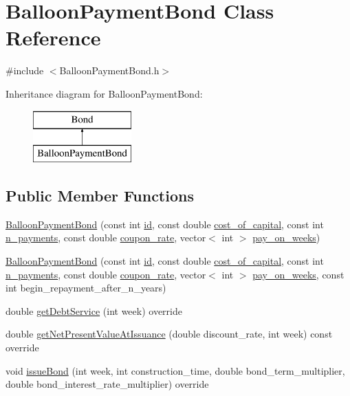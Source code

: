 \hypertarget{classBalloonPaymentBond}{}\section{Balloon\+Payment\+Bond Class Reference}
\label{classBalloonPaymentBond}


{\ttfamily \#include $<$Balloon\+Payment\+Bond.\+h$>$}

Inheritance diagram for Balloon\+Payment\+Bond\+:\begin{figure}[H]
\begin{center}
\leavevmode
\includegraphics[height=2.000000cm]{classBalloonPaymentBond}
\end{center}
\end{figure}
\subsection*{Public Member Functions}
\begin{DoxyCompactItemize}
\item 
\mbox{\hyperlink{classBalloonPaymentBond_a03b25124896e67f851a35721c37705fe}{Balloon\+Payment\+Bond}} (const int \mbox{\hyperlink{classBond_a7f75bcafbc16676ad6dbafbf40afae4a}{id}}, const double \mbox{\hyperlink{classBond_ad98df7d28b398e620286f95ee085439b}{cost\+\_\+of\+\_\+capital}}, const int \mbox{\hyperlink{classBond_a4a227b6de2eeada118d82ab1633b1db8}{n\+\_\+payments}}, const double \mbox{\hyperlink{classBond_a5f66785534e24caa43d9f730130a6463}{coupon\+\_\+rate}}, vector$<$ int $>$ \mbox{\hyperlink{classBond_ae8dd46fcbf95c993460ffe4ea1f52739}{pay\+\_\+on\+\_\+weeks}})
\item 
\mbox{\hyperlink{classBalloonPaymentBond_afc8bb53b6642dac9811414b447279e5b}{Balloon\+Payment\+Bond}} (const int \mbox{\hyperlink{classBond_a7f75bcafbc16676ad6dbafbf40afae4a}{id}}, const double \mbox{\hyperlink{classBond_ad98df7d28b398e620286f95ee085439b}{cost\+\_\+of\+\_\+capital}}, const int \mbox{\hyperlink{classBond_a4a227b6de2eeada118d82ab1633b1db8}{n\+\_\+payments}}, const double \mbox{\hyperlink{classBond_a5f66785534e24caa43d9f730130a6463}{coupon\+\_\+rate}}, vector$<$ int $>$ \mbox{\hyperlink{classBond_ae8dd46fcbf95c993460ffe4ea1f52739}{pay\+\_\+on\+\_\+weeks}}, const int begin\+\_\+repayment\+\_\+after\+\_\+n\+\_\+years)
\item 
double \mbox{\hyperlink{classBalloonPaymentBond_a8648a2ae688f90a3b2e6689711c22b9d}{get\+Debt\+Service}} (int week) override
\item 
double \mbox{\hyperlink{classBalloonPaymentBond_a11e5aecaf542cfbbb2303e98fb0b93bf}{get\+Net\+Present\+Value\+At\+Issuance}} (double discount\+\_\+rate, int week) const override
\item 
void \mbox{\hyperlink{classBalloonPaymentBond_af22552acd74b08dbb1d308cc5e45344c}{issue\+Bond}} (int week, int construction\+\_\+time, double bond\+\_\+term\+\_\+multiplier, double bond\+\_\+interest\+\_\+rate\+\_\+multiplier) override
\end{DoxyCompactItemize}
